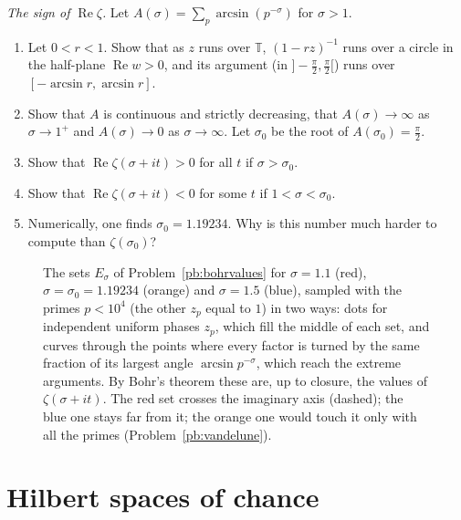 \begin{exercise}[Journey]\label{pb:vandelune}
\emph{The sign of $\operatorname{Re}\zeta$.} Let $A(\sigma)=\sum_p\arcsin(p^{-\sigma})$ for $\sigma>1$.
\begin{enumerate}[label=(\alph*)]
\item Let $0<r<1$. Show that as $z$ runs over $\mathbb T$, $(1-rz)^{-1}$ runs over a circle in the half-plane $\operatorname{Re}w>0$, and its argument (in
$]-\frac\pi2,\frac\pi2[$) runs over $[-\arcsin r,\arcsin r]$.
\item Show that $A$ is continuous and strictly decreasing, that $A(\sigma)\to\infty$ as $\sigma\to1^+$ and $A(\sigma)\to0$ as $\sigma\to\infty$. Let $\sigma_0$ be the
root of $A(\sigma_0)=\frac\pi2$.
\item Show that $\operatorname{Re}\zeta(\sigma+it)>0$ for all $t$ if $\sigma>\sigma_0$.
\item Show that $\operatorname{Re}\zeta(\sigma+it)<0$ for some $t$ if $1<\sigma<\sigma_0$.
\item Numerically, one finds $\sigma_0=1.19234$. Why is this number much harder to compute than $\zeta(\sigma_0)$?
\end{enumerate}
\end{exercise}

\begin{figure}[ht]
\centering
{}
\caption{The sets $E_\sigma$ of Problem~\ref{pb:bohrvalues} for $\sigma=1.1$ (red), $\sigma=\sigma_0=1.19234$ (orange) and $\sigma=1.5$ (blue), sampled with the primes
$p<10^4$ (the other $z_p$ equal to $1$) in two ways: dots for independent uniform phases $z_p$, which fill the middle of each set, and curves through the points where every
factor is turned by the same fraction of its largest angle $\arcsin p^{-\sigma}$, which reach the extreme arguments. By Bohr's theorem these are, up to closure, the values of $\zeta(\sigma+it)$. The red set
crosses the imaginary axis (dashed); the blue one stays far from it; the orange one would touch it only with all the primes (Problem~\ref{pb:vandelune}).}\label{fig:zetavalues}
\end{figure}

\section{Hilbert spaces of chance}

